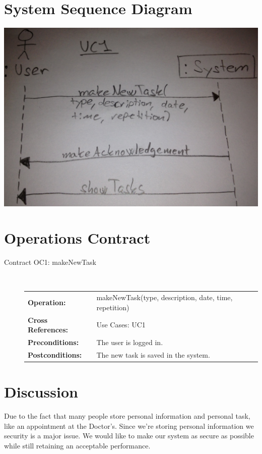 \documentclass[a4paper, 10pt]{article}
\begin{document}
\section{System Sequence Diagram}
\includegraphics[width=\linewidth]{../Pictures/A38_SSD_UC1.jpg} 

\section{Operations Contract}
\begin{description}
\item[\large Contract OC1: makeNewTask] \hfill \\
\begin{tabular}{ l l }
	\textbf{Operation:} & makeNewTask(type, description, date, time, repetition) \\
	\textbf{Cross References:} & Use Cases: UC1 \\
	\textbf{Preconditions:} & The user is logged in. \\
	\textbf{Postconditions:} & The new task is saved in the system.
\end{tabular}
\end{description}

\section{Discussion}
Due to the fact that many people store personal information and personal task, like an appointment at the Doctor's. Since we're storing personal information we security is a major issue. We would like to make our system as secure as possible while still retaining an acceptable performance.
\end{document}
